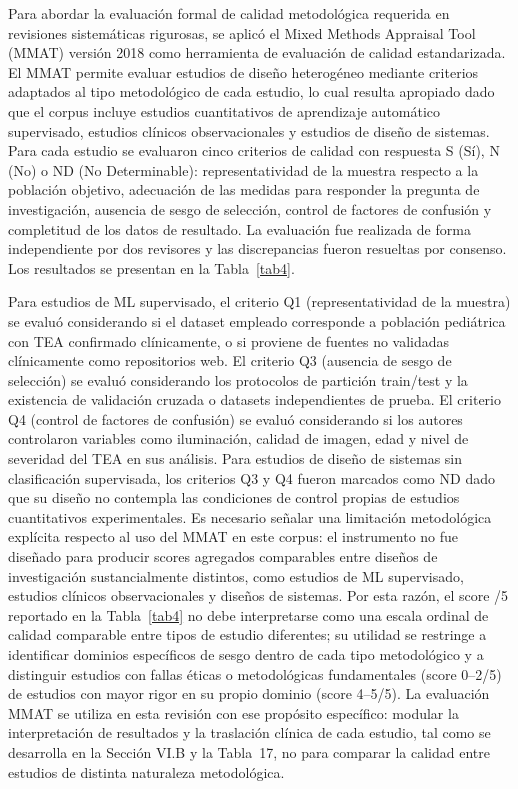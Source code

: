\documentclass[ASNA,twocolumn]{USG}
\begin{document}
	Para abordar la evaluación formal de calidad metodológica requerida en revisiones
	sistemáticas rigurosas, se aplicó el Mixed Methods Appraisal Tool (MMAT) versión
	2018 como herramienta de evaluación de calidad estandarizada. El MMAT permite
	evaluar estudios de diseño heterogéneo mediante criterios adaptados al tipo
	metodológico de cada estudio, lo cual resulta apropiado dado que el corpus incluye
	estudios cuantitativos de aprendizaje automático supervisado, estudios clínicos
	observacionales y estudios de diseño de sistemas. Para cada estudio se evaluaron
	cinco criterios de calidad con respuesta S (Sí), N (No) o ND (No Determinable):
	representatividad de la muestra respecto a la población objetivo, adecuación de
	las medidas para responder la pregunta de investigación, ausencia de sesgo de
	selección, control de factores de confusión y completitud de los datos de
	resultado. La evaluación fue realizada de forma independiente por dos revisores y
	las discrepancias fueron resueltas por consenso. Los resultados se presentan en
	la Tabla~\ref{tab4}.
	
	Para estudios de ML supervisado, el criterio Q1 (representatividad de la muestra)
	se evaluó considerando si el dataset empleado corresponde a población pediátrica
	con TEA confirmado clínicamente, o si proviene de fuentes no validadas clínicamente
	como repositorios web. El criterio Q3 (ausencia de sesgo de selección) se evaluó
	considerando los protocolos de partición train/test y la existencia de validación
	cruzada o datasets independientes de prueba. El criterio Q4 (control de factores
	de confusión) se evaluó considerando si los autores controlaron variables como
	iluminación, calidad de imagen, edad y nivel de severidad del TEA en sus análisis.
	Para estudios de diseño de sistemas sin clasificación supervisada, los criterios
	Q3 y Q4 fueron marcados como ND dado que su diseño no contempla las condiciones
	de control propias de estudios cuantitativos experimentales. Es necesario señalar
	una limitación metodológica explícita respecto al uso del MMAT en este corpus: el
	instrumento no fue diseñado para producir scores agregados comparables entre
	diseños de investigación sustancialmente distintos, como estudios de ML supervisado,
	estudios clínicos observacionales y diseños de sistemas. Por esta razón, el score
	/5 reportado en la Tabla~\ref{tab4} no debe interpretarse como una escala ordinal
	de calidad comparable entre tipos de estudio diferentes; su utilidad se restringe
	a identificar dominios específicos de sesgo dentro de cada tipo metodológico y a
	distinguir estudios con fallas éticas o metodológicas fundamentales (score 0--2/5)
	de estudios con mayor rigor en su propio dominio (score 4--5/5). La evaluación
	MMAT se utiliza en esta revisión con ese propósito específico: modular la
	interpretación de resultados y la traslación clínica de cada estudio, tal como se
	desarrolla en la Sección VI.B y la Tabla~17, no para comparar la calidad entre
	estudios de distinta naturaleza metodológica.
	
\end{document}
